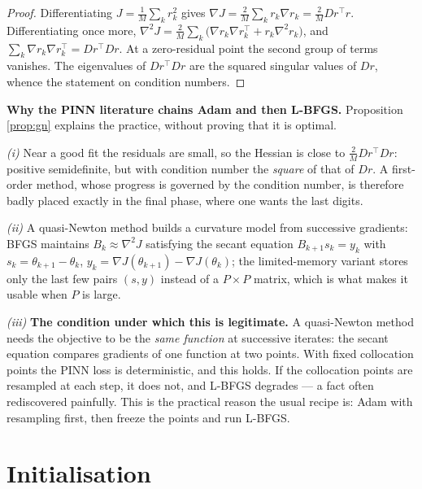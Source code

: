 \documentclass[11pt,a4paper]{article}
\begin{document}
\begin{proof}
Differentiating $J = \frac1M \sum_k r_k^2$ gives
$\nabla J = \frac{2}{M}\sum_k r_k \nabla r_k = \frac{2}{M}Dr^{\!\top}r$. Differentiating once more,
$\nabla^2 J = \frac{2}{M}\sum_k \big(\nabla r_k \nabla r_k^{\!\top} + r_k \nabla^2 r_k\big)$, and
$\sum_k \nabla r_k\nabla r_k^{\!\top} = Dr^{\!\top}Dr$. At a zero-residual point the second group of
terms vanishes. The eigenvalues of $Dr^{\!\top}Dr$ are the squared singular values of $Dr$, whence
the statement on condition numbers.
\end{proof}

\begin{keybox}
\textbf{Why the PINN literature chains Adam and then L-BFGS.} Proposition \ref{prop:gn} explains the
practice, without proving that it is optimal.

\smallskip
\emph{(i)} Near a good fit the residuals are small, so the Hessian is close to
$\frac{2}{M}Dr^{\!\top}Dr$: positive semidefinite, but with condition number the \emph{square} of
that of $Dr$. A first-order method, whose progress is governed by the condition number, is therefore
badly placed exactly in the final phase, where one wants the last digits.

\smallskip
\emph{(ii)} A quasi-Newton method builds a curvature model from successive gradients: BFGS maintains
$B_k \approx \nabla^2 J$ satisfying the secant equation $B_{k+1}s_k = y_k$ with
$s_k = \theta_{k+1}-\theta_k$, $y_k = \nabla J(\theta_{k+1}) - \nabla J(\theta_k)$; the
limited-memory variant stores only the last few pairs $(s,y)$ instead of a $P \times P$ matrix,
which is what makes it usable when $P$ is large.

\smallskip
\emph{(iii)} \textbf{The condition under which this is legitimate.} A quasi-Newton method needs the
objective to be the \emph{same function} at successive iterates: the secant equation compares
gradients of one function at two points. With fixed collocation points the PINN loss is
deterministic, and this holds. If the collocation points are resampled at each step, it does not,
and L-BFGS degrades --- a fact often rediscovered painfully. This is the practical reason the usual
recipe is: Adam with resampling first, then freeze the points and run L-BFGS.
\end{keybox}

\section{Initialisation}
\end{document}
